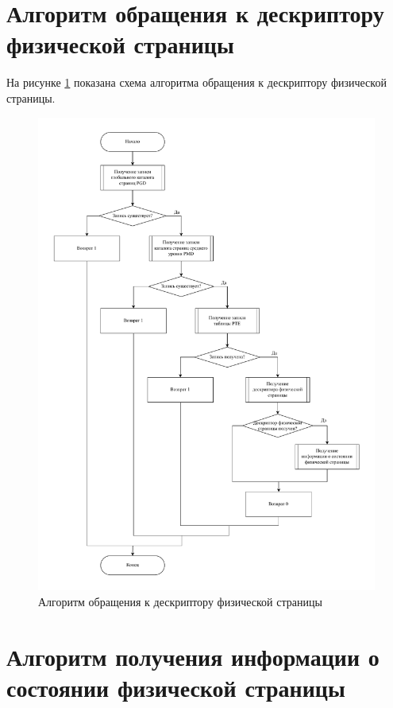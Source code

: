 \section{Алгоритм обращения к дескриптору физической страницы}

На рисунке \ref{img:get-page} показана схема алгоритма обращения к дескриптору физической страницы.

\begin{figure}[H]
	\begin{center}
		\includegraphics[scale=0.65]{inc/img/get_page.pdf}
	\end{center}
	\captionsetup{justification=centering}
	\caption{Алгоритм обращения к дескриптору физической страницы}
	\label{img:get-page}
\end{figure}

\section{Алгоритм получения информации о состоянии физической страницы}

